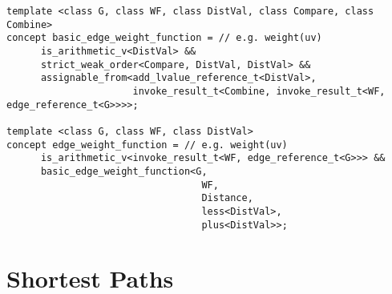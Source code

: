 
\begin{lstlisting}
template <class G, class WF, class DistVal, class Compare, class Combine>
concept basic_edge_weight_function = // e.g. weight(uv)
      is_arithmetic_v<DistVal> &&
      strict_weak_order<Compare, DistVal, DistVal> &&
      assignable_from<add_lvalue_reference_t<DistVal>, 
                      invoke_result_t<Combine, invoke_result_t<WF, edge_reference_t<G>>>>;

template <class G, class WF, class DistVal>
concept edge_weight_function = // e.g. weight(uv)
      is_arithmetic_v<invoke_result_t<WF, edge_reference_t<G>>> &&
      basic_edge_weight_function<G,
                                  WF,
                                  Distance,
                                  less<DistVal>,
                                  plus<DistVal>>;
\end{lstlisting}

\begin{comment}
      \phil{Queueable isn't being used.}
      \begin{lstlisting}
      // queueableQ can represent std::queue and std::priority\_queue
      template <class Q>
      concept queueable = requires(Q&& q, Q::value_type value) {
      Q::value_type;
      Q::size_type;
      Q::reference;

      {q.top()};
      {q.push(value)};
      {q.pop()};
      {q.empty()};
      {q.size()};
      };
      \end{lstlisting}
\end{comment}



\section{Shortest Paths}




